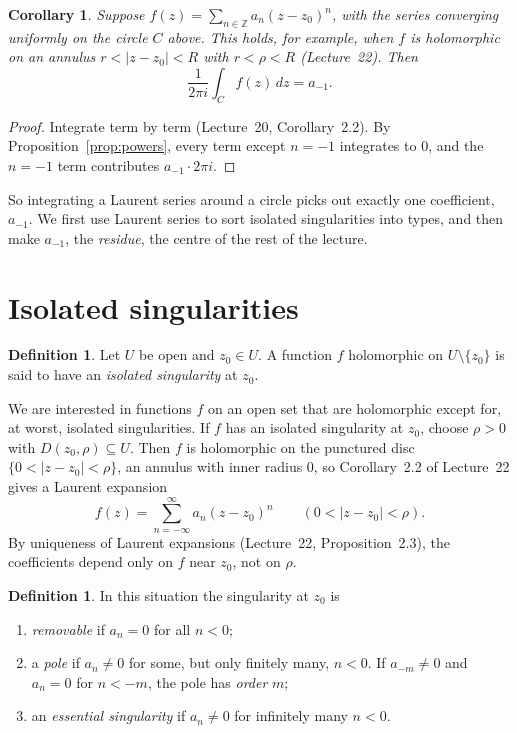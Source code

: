 \documentclass[11pt]{article}
\theoremstyle{plain}
\newtheorem{corollary}[theorem]{Corollary}
\theoremstyle{definition}
\newtheorem{definition}[theorem]{Definition}
\theoremstyle{remark}
\numberwithin{equation}{section}
\newcommand{\Z}{\mathbb{Z}}
\begin{document}
\begin{corollary}\label{cor:only-a-minus-1}
Suppose $f(z)=\sum_{n\in\Z}a_n(z-z_0)^n$, with the series converging
uniformly on the circle $C$ above. This holds, for example, when $f$ is
holomorphic on an annulus $r<|z-z_0|<R$ with $r<\rho<R$ (Lecture~22). Then
\begin{equation}
 \frac{1}{2\pi i}\int_Cf(z)\,dz=a_{-1}.
\end{equation}
\end{corollary}
\begin{proof}
Integrate term by term (Lecture~20, Corollary~2.2). By
Proposition~\ref{prop:powers}, every term except $n=-1$ integrates to $0$,
and the $n=-1$ term contributes $a_{-1}\cdot2\pi i$.
\end{proof}
So integrating a Laurent series around a circle picks out exactly one
coefficient, $a_{-1}$. We first use Laurent series to sort isolated
singularities into types, and then make $a_{-1}$, the \emph{residue}, the
centre of the rest of the lecture.

\section{Isolated singularities}
\begin{definition}
Let $U$ be open and $z_0\in U$. A function $f$ holomorphic on
$U\setminus\{z_0\}$ is said to have an \emph{isolated singularity} at $z_0$.
\end{definition}
We are interested in functions $f$ on an open set that are holomorphic
except for, at worst, isolated singularities. If $f$ has an isolated
singularity at $z_0$, choose $\rho>0$ with $D(z_0,\rho)\subseteq U$. Then $f$
is holomorphic on the punctured disc $\{0<|z-z_0|<\rho\}$, an annulus with
inner radius $0$, so Corollary~2.2 of Lecture~22 gives a Laurent
expansion
\begin{equation}
 f(z)=\sum_{n=-\infty}^{\infty}a_n(z-z_0)^n\qquad(0<|z-z_0|<\rho).
\end{equation}
By uniqueness of Laurent expansions (Lecture~22, Proposition~2.3), the coefficients depend only on $f$ near
$z_0$, not on $\rho$.

\begin{definition}
In this situation the singularity at $z_0$ is
\begin{enumerate}
 \item \emph{removable} if $a_n=0$ for all $n<0$;
 \item a \emph{pole} if $a_n\ne0$ for some, but only finitely many, $n<0$.
 If $a_{-m}\ne0$ and $a_n=0$ for $n<-m$, the pole has \emph{order} $m$;
 \item an \emph{essential singularity} if $a_n\ne0$ for infinitely many
 $n<0$.
\end{enumerate}
\end{definition}
\end{document}
